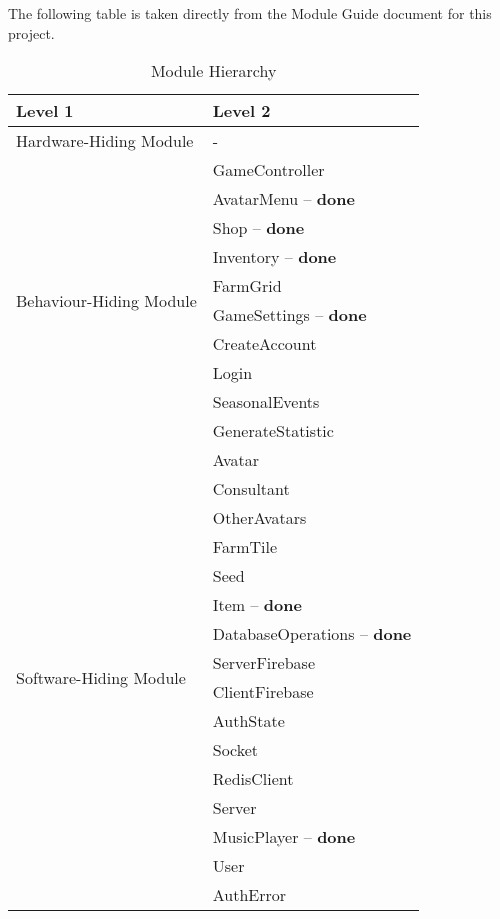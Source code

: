 \documentclass[12pt, titlepage]{article}
\begin{document}
The following table is taken directly from the Module Guide document for this project.

\begin{table}[H]
\centering
\begin{tabular}{p{} p{}}
\toprule
\textbf{Level 1} & \textbf{Level 2}\\
\midrule

{Hardware-Hiding Module} & - \\
\midrule

\multirow{10}{0.3\textwidth}{Behaviour-Hiding Module} & GameController\\
& AvatarMenu  \quad -- \textbf{done}\\
& Shop \quad -- \textbf{done}\\ 
& Inventory \quad -- \textbf{done}\\ 
& FarmGrid\\
& GameSettings \quad -- \textbf{done}\\
& CreateAccount\\
& Login\\
& SeasonalEvents\\
& GenerateStatistic\\
\midrule

\multirow{18}{0.3\textwidth}{Software-Hiding Module} & Avatar\\
& Consultant\\
& OtherAvatars\\
& FarmTile\\
& Seed\\
& Item \quad -- \textbf{done}\\ 
& DatabaseOperations \quad -- \textbf{done}\\ 
& ServerFirebase\\
& ClientFirebase\\
& AuthState\\
& Socket\\
& RedisClient\\
& Server\\ 
& MusicPlayer \quad -- \textbf{done}\\
& User \\
& AuthError \\
\bottomrule

\end{tabular}
\caption{Module Hierarchy}
\label{TblMH}
\end{table}

\newpage

\end{document}
